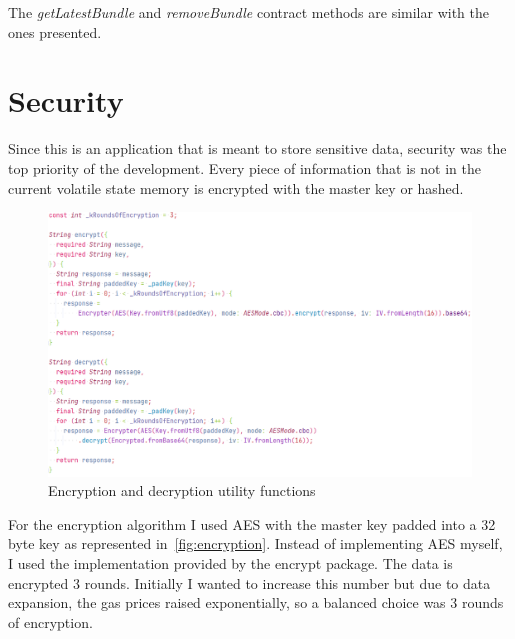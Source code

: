 \documentclass[a4paper,12pt]{report}
\begin{document}
The \textit{getLatestBundle} and \textit{removeBundle} contract methods are
similar with the ones presented.

\section{Security}

Since this is an application that is meant to store sensitive data, security
was the top priority of the development. Every piece of information that is not
in the current volatile state memory is encrypted with the master key or
hashed.

\begin{figure}[H]
    \centering
    \includegraphics[scale=0.6]{images/code/encryption.png}
    \caption{Encryption and decryption utility functions}\label{fig:encryption}
\end{figure}

For the encryption algorithm I used AES with the master key padded into a 32
byte key as represented in~\autoref{fig:encryption}. Instead of implementing
AES myself, I used the implementation provided by the encrypt
package\cite{encryptDocs}. The data is encrypted 3 rounds. Initially I wanted
to increase this number but due to data expansion, the gas prices raised
exponentially, so a balanced choice was 3 rounds of encryption.
\end{document}
